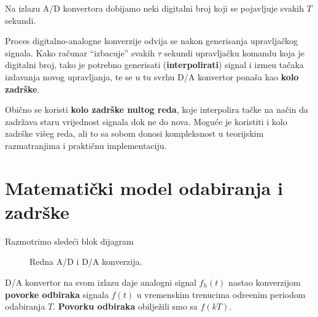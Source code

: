 \documentclass[12pt]{IEEEtran}
\numberwithin{equation}{subsection}
\numberwithin{figure}{section}
\begin{document}
\vspace{12pt}

Na izlazu A/D konvertora dobijamo neki digitalni broj koji se pojavljuje svakih 
$T$ sekundi.

\vspace{12pt}

Proces digitalno-analogne konverzije odvija se nakon generisanja upravlja\v{c}kog
signala. Kako ra\v{c}unar \enquote{izbacuje} svakih $\tau$ sekundi upravlja\v{c}ku komandu 
koja je digitalni broj, tako je potrebno generisati (\textbf{interpolirati}) signal i izme\dj{}u 
ta\v{c}aka izdavanja novog upravljanja, te se u tu svrhu D/A konvertor pona\v{s}a 
kao \textbf{kolo zadr\v{s}ke}. 

Obi\v{c}no se koristi \textbf{kolo zadr\v{s}ke nultog reda}, koje 
interpolira ta\v{c}ke na na\v{c}in da zadr\v{z}ava staru vrijednost 
signala dok ne do nova. Mogu\'{c}e je koristiti i kolo zadr\v{s}ke 
vi\v{s}eg reda, ali to sa sobom donosi kompleksnost u teorijskim razmatranjima i 
prakti\v{c}nu implementaciju.

\newpage
\section{\textbf{Matemati\v{c}ki model odabiranja i zadr\v{s}ke}}

Razmotrimo slede\'{c}i blok dijagram

\begin{figure}[h]
    \centering
    \caption{Redna A/D i D/A konverzija.}
\end{figure}

D/A konvertor na svom izlazu daje analogni signal $f_{h}(t)$ nastao 
konverzijom \textbf{povorke odbiraka} signala $f(t)$ u vremenskim trenucima
odre\dj{}enim periodom odabiranja $T$. \textbf{Povorku odbiraka} obilje\v{z}ili 
smo sa $f(kT)$.
\end{document}
